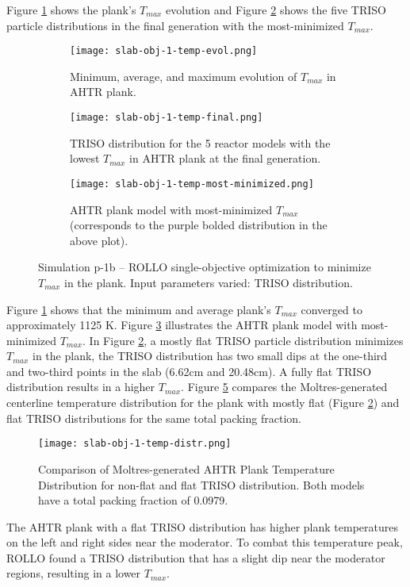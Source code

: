 Figure \ref{fig:slab-obj-1-temp-evol} shows the plank's $T_{max}$ evolution 
and Figure \ref{fig:slab-obj-1-temp-final} shows the five TRISO particle 
distributions in the final generation with the most-minimized $T_{max}$.
\begin{figure}[htbp!]
    \centering
    \begin{subfigure}{0.95\textwidth}
        \texttt{[image: slab-obj-1-temp-evol.png]}
        \caption{Minimum, average, and maximum evolution of $T_{max}$ in 
        AHTR plank.}
        \label{fig:slab-obj-1-temp-evol} 
    \end{subfigure}
    \begin{subfigure}{0.95\textwidth}
        \texttt{[image: slab-obj-1-temp-final.png]}
        \caption{TRISO distribution for the 5 reactor models with the 
        lowest $T_{max}$ in AHTR plank at the final generation.}
        \label{fig:slab-obj-1-temp-final} 
    \end{subfigure}
    \begin{subfigure}{0.95\textwidth}
        \texttt{[image: slab-obj-1-temp-most-minimized.png]}
        \caption{\gls{AHTR} plank model with most-minimized $T_{max}$
        (corresponds to the purple bolded distribution in the above plot).}
        \label{fig:slab-obj-1-temp-most-minimized} 
    \end{subfigure}
    \caption{Simulation p-1b -- ROLLO single-objective optimization to minimize $T_{max}$ 
    in the plank. Input parameters varied: TRISO distribution.}
    \label{fig:slab-obj-1-temp}
\end{figure}
Figure \ref{fig:slab-obj-1-temp-evol} shows that the minimum and average plank's 
$T_{max}$ converged to approximately 1125 K. 
Figure \ref{fig:slab-obj-1-temp-most-minimized} illustrates the \gls{AHTR} plank model 
with most-minimized $T_{max}$. 
In Figure \ref{fig:slab-obj-1-temp-final}, a mostly flat TRISO 
particle distribution minimizes $T_{max}$ in the plank, the TRISO distribution 
has two small dips at the one-third and two-third points in the slab (6.62cm and 20.48cm). 
A fully flat \gls{TRISO} distribution results in a higher $T_{max}$.
Figure \ref{fig:slab-obj-1-temp-distr} compares the Moltres-generated centerline 
temperature distribution for the plank with mostly flat (Figure 
\ref{fig:slab-obj-1-temp-final}) and flat TRISO distributions for the same 
total packing fraction.
\begin{figure}[htbp!]
    \centering
    \texttt{[image: slab-obj-1-temp-distr.png]}
    \caption{Comparison of Moltres-generated AHTR Plank Temperature Distribution for non-flat and flat
    TRISO distribution. Both models have a total packing fraction of 0.0979.}
    \label{fig:slab-obj-1-temp-distr}
\end{figure}
The \gls{AHTR} plank with a flat \gls{TRISO} distribution has higher plank temperatures 
on the left and right sides near the moderator. 
To combat this temperature peak, ROLLO found a \gls{TRISO} distribution that 
has a slight dip near the moderator regions, resulting in a lower $T_{max}$.

